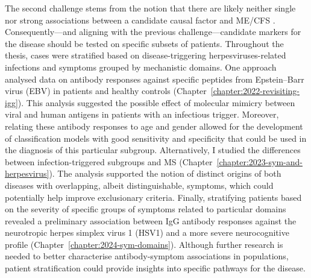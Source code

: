 The second challenge stems from the notion that there are likely neither single nor strong associations between a candidate causal factor and ME/CFS \citep{dibble2020GeneticRisk, malato2023ImpactMisdiagnosis}.
Consequently---and aligning with the previous challenge---candidate markers for the disease should be tested on specific subsets of patients.
Throughout the thesis, \cfs cases were stratified based on disease-triggering herpesviruses-related infections and symptoms grouped by mechanistic domains.
One approach analysed data on antibody responses against specific peptides from Epstein–Barr virus (EBV) in \cfs patients and healthy controls (Chapter~\ref{chapter:2022-revisiting-igg}).
This analysis suggested the possible effect of molecular mimicry between viral and human antigens in patients with an infectious trigger.
Moreover, relating these antibody responses to age and gender allowed for the development of classification models with good sensitivity and specificity that could be used in the diagnosis of this particular subgroup.
Alternatively, I studied the differences between \cfs infection-triggered subgroups and MS (Chapter~\ref{chapter:2023-sym-and-herpesvirus}).
The analysis supported the notion of distinct origins of both diseases with overlapping, albeit distinguishable, symptoms, which could potentially help improve exclusionary criteria.
Finally, stratifying patients based on the severity of specific groups of symptoms related to particular domains revealed a preliminary association between IgG antibody responses against the neurotropic herpes simplex virus 1 (HSV1) and a more severe neurocognitive profile (Chapter~\ref{chapter:2024-sym-domains}).
Although further research is needed to better characterise antibody-symptom associations in \cfs populations, patient stratification could provide insights into specific pathways for the disease.

